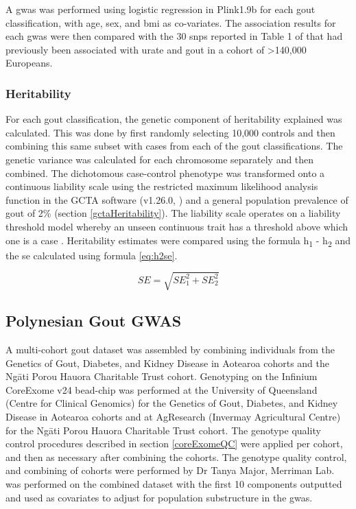 \documentclass[]{report}
\newcommand{\tex}[1]{#1}
\begin{document}
A \gls{gwas} was performed using logistic regression in Plink1.9b
\citep{Chang2015, plink2} for each gout classification, with age, sex,
and \gls{bmi} as co-variates. The association results for each
\gls{gwas} were then compared with the 30 \glspl{snp} reported in Table
1 of \citet{Kottgen2013} that had previously been associated with urate
and gout in a cohort of \textgreater{}140,000 Europeans.

\subsubsection{Heritability}\label{heritability}

For each gout classification, the genetic component of heritability
explained was calculated. This was done by first randomly selecting
10,000 controls and then combining this same subset with cases from each
of the gout classifications. The genetic variance was calculated for
each chromosome separately and then combined. The dichotomous
case-control phenotype was transformed onto a continuous liability scale
using the restricted maximum likelihood analysis function in the GCTA
software (v1.26.0, \citet{Yang2011part}) and a general population
prevalence of gout of 2\% (section \ref{gctaHeritability}). The
liability scale operates on a liability threshold model whereby an
unseen continuous trait has a threshold above which one is a case
\citep{Lee2011, Zuk2012}. Heritability estimates were compared using the
formula h\textsubscript{1} - h\textsubscript{2} and the \gls{se}
calculated using formula \eqref{eq:h2se}.

\begin{equation} 
 SE = \sqrt{SE_1^2 + SE_2^2}
 \label{eq:h2se}
\end{equation}

\subsection{Polynesian Gout GWAS}\label{polynesian-gout-gwas}

A multi-cohort gout dataset was assembled by combining individuals from
the Genetics of Gout, Diabetes, and Kidney Disease in Aotearoa cohorts
and the Ng\tex{\={a}}ti Porou Hauora Charitable Trust cohort. Genotyping
on the Infinium CoreExome v24 bead-chip was performed at the University
of Queensland (Centre for Clinical Genomics) for the Genetics of Gout,
Diabetes, and Kidney Disease in Aotearoa cohorts and at AgResearch
(Invermay Agricultural Centre) for the Ng\tex{\={a}}ti Porou Hauora
Charitable Trust cohort. The genotype quality control procedures
described in section \ref{coreExomeQC} were applied per cohort, and then
as necessary after combining the cohorts. The genotype quality control,
and combining of cohorts were performed by Dr Tanya Major, Merriman Lab.
 was performed on the combined dataset with the first 10
components outputted and used as covariates to adjust for population
substructure in the \gls{gwas}.
\end{document}
